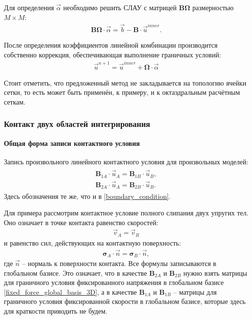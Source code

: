 Для определения $\vec{\alpha}$ необходимо решить 
СЛАУ с матрицей $\mathbf{B} \mathbf{\Omega}$ размерностью $M \times M$:
\begin{eqnarray}
\label{SLE_on_alpha}
	\mathbf{B} \mathbf{\Omega} \cdot \vec{\alpha} = \vec{b} - \mathbf{B} \cdot \vec{u}^{inner}.
\end{eqnarray}

После определения коэффициентов линейной комбинации производится собственно коррекция,
обеспечивающая выполнение граничных условий:
\begin{eqnarray}
\vec{u}^{n+1} = \vec{u}^{inner} + \mathbf{\Omega} \cdot \vec{\alpha}
\end{eqnarray}

Стоит отметить, что предложенный метод 
не закладывается на топологию ячейки сетки, то есть может быть применён, 
к примеру, и к октаэдральным расчётным сеткам.


\subsubsection{Контакт двух областей интегрирования}
\paragraph{Общая форма записи контактного условия}
Запись произвольного линейного контактного условия для произвольных моделей:
\begin{eqnarray}
\label{contact_condition}
\begin{split}
	\mathbf{B}_{1A} \cdot \vec{u}_A = \mathbf{B}_{1B} \cdot \vec{u}_B, \\
	\mathbf{B}_{2A} \cdot \vec{u}_A = \mathbf{B}_{2B} \cdot \vec{u}_B.
\end{split}
\end{eqnarray}
Здесь обозначения те же, что и в \eqref{boundary_condition}.

Для примера рассмотрим контактное условие полного слипания двух упругих тел.
Оно означает в точке контакта равенство скоростей:
\begin{eqnarray}
\vec{v}_A = \vec{v}_B
\end{eqnarray}
и равенство сил, действующих на контактную поверхность:
\begin{eqnarray}
\mathbf{\sigma}_A \cdot \vec{n} = \mathbf{\sigma}_B \cdot \vec{n},
\end{eqnarray}
где $\vec{n}$ -- нормаль к поверхности контакта. 
Все формулы записываются в глобальном базисе. 
Это означает, что в качестве $\mathbf{B}_{2A}$ и $\mathbf{B}_{2B}$ 
нужно взять матрицы для граничного условия фиксированного напряжения в глобальном базисе 
\eqref{fixed_force_global_basis_3D}, а в качестве 
$\mathbf{B}_{1A}$ и $\mathbf{B}_{1B}$ -- матрицы для граничного условия 
фиксированной скорости в глобальном базисе, 
которые здесь для краткости приводить не будем.

